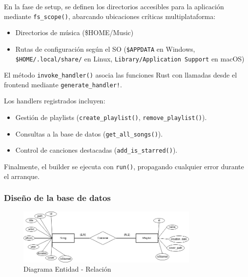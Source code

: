 \documentclass[11pt, a4paper]{article}
\begin{document}
            En la fase de setup, se definen los directorios accesibles para la aplicación mediante \texttt{fs\_scope()}, abarcando ubicaciones críticas multiplataforma:

            \begin{itemize}
                \item Directorios de música (\$HOME/Music)
                \item Rutas de configuración según el SO (\texttt{\$APPDATA} en Windows, \texttt{\$HOME/.local/share/} en Linux, \texttt{Library/Application Support} en macOS)
            \end{itemize}

            El método \texttt{invoke\_handler()} asocia las funciones Rust con llamadas desde el frontend mediante \texttt{generate\_handler!}.

            Los handlers registrados incluyen:

            \begin{itemize}
                \item Gestión de playlists (\texttt{create\_playlist()}, \texttt{remove\_playlist()}).
                \item Consultas a la base de datos (\texttt{get\_all\_songs()}).
                \item Control de canciones destacadas (\texttt{add\_is\_starred()}).
            \end{itemize}

            Finalmente, el builder se ejecuta con \texttt{run()}, propagando cualquier error durante el arranque.

            \subsubsection{Diseño de la base de datos}

            \begin{figure}[H]
              \centering
              \includegraphics[width=0.8\textwidth]{media/ER.drawio.png}
              \caption{Diagrama Entidad - Relación}
              \label{fig:er}
            \end{figure}
\end{document}
